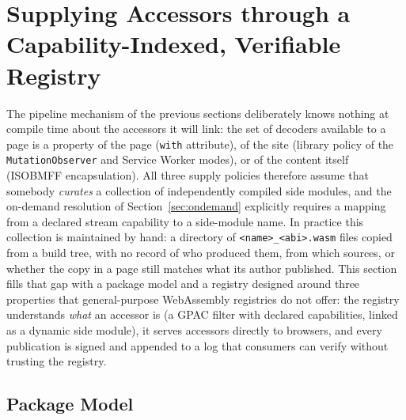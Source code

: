 %
\newcommand{\toolname}{\texttt{bevara}}
\newcommand{\registry}{registry}

\section{Supplying Accessors through a Capability-Indexed, Verifiable Registry}
\label{sec:registry}

The pipeline mechanism of the previous sections deliberately knows nothing at
compile time about the accessors it will link: the set of decoders available
to a page is a property of the page (\texttt{with} attribute), of the site
(library policy of the \texttt{MutationObserver} and Service Worker modes), or
of the content itself (ISOBMFF encapsulation). All three supply policies
therefore assume that somebody \emph{curates} a collection of independently
compiled side modules, and the on-demand resolution of
Section~\ref{sec:ondemand} explicitly requires a mapping from a declared
stream capability to a side-module name. In practice this collection is
maintained by hand: a directory of \texttt{<name>\_<abi>.wasm} files copied
from a build tree, with no record of who produced them, from which sources, or
whether the copy in a page still matches what its author published. This
section fills that gap with a package model and a registry designed around
three properties that general-purpose WebAssembly registries do not offer: the
registry understands \emph{what} an accessor is (a GPAC filter with declared
capabilities, linked as a dynamic side module), it serves accessors directly to
browsers, and every publication is signed and appended to a log that consumers
can verify without trusting the registry.

\subsection{Package Model}
\label{sec:registry-model}

